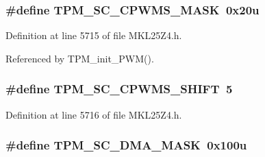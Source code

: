 \subsubsection[{\texorpdfstring{T\+P\+M\+\_\+\+S\+C\+\_\+\+C\+P\+W\+M\+S\+\_\+\+M\+A\+SK}{TPM_SC_CPWMS_MASK}}]{\setlength{\rightskip}{0pt plus 5cm}\#define T\+P\+M\+\_\+\+S\+C\+\_\+\+C\+P\+W\+M\+S\+\_\+\+M\+A\+SK~0x20u}\hypertarget{group___t_p_m___register___masks_ga2ed4f55ed6ec313d2f5c0cef0d9606e7}{}\label{group___t_p_m___register___masks_ga2ed4f55ed6ec313d2f5c0cef0d9606e7}


Definition at line 5715 of file M\+K\+L25\+Z4.\+h.



Referenced by T\+P\+M\+\_\+init\+\_\+\+P\+W\+M().

\subsubsection[{\texorpdfstring{T\+P\+M\+\_\+\+S\+C\+\_\+\+C\+P\+W\+M\+S\+\_\+\+S\+H\+I\+FT}{TPM_SC_CPWMS_SHIFT}}]{\setlength{\rightskip}{0pt plus 5cm}\#define T\+P\+M\+\_\+\+S\+C\+\_\+\+C\+P\+W\+M\+S\+\_\+\+S\+H\+I\+FT~5}\hypertarget{group___t_p_m___register___masks_ga1bf84a093f66cf0f37c7b77ee16c32b3}{}\label{group___t_p_m___register___masks_ga1bf84a093f66cf0f37c7b77ee16c32b3}


Definition at line 5716 of file M\+K\+L25\+Z4.\+h.

\subsubsection[{\texorpdfstring{T\+P\+M\+\_\+\+S\+C\+\_\+\+D\+M\+A\+\_\+\+M\+A\+SK}{TPM_SC_DMA_MASK}}]{\setlength{\rightskip}{0pt plus 5cm}\#define T\+P\+M\+\_\+\+S\+C\+\_\+\+D\+M\+A\+\_\+\+M\+A\+SK~0x100u}\hypertarget{group___t_p_m___register___masks_ga5d17b5a81f3f84eee65c94d5b0e7eca6}{}\label{group___t_p_m___register___masks_ga5d17b5a81f3f84eee65c94d5b0e7eca6}


